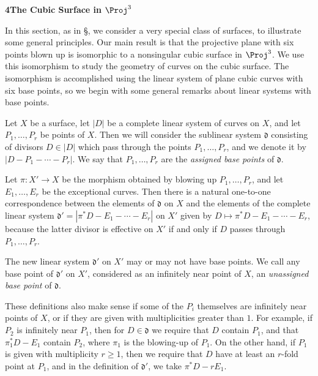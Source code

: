 {\bigskip
\noindent\hypertarget{sec-V-4}{}\textbf{\large 4\quad The Cubic Surface in $\Proj^3$}\par\medskip

\noindent In this section, as in \S{}, we consider a very special class of surfaces, to illustrate some general principles. Our main result is that the projective plane with six points blown up is isomorphic to a nonsingular cubic surface in $\Proj^3$. We use this isomorphism to study the geometry of curves on the cubic surface. The isomorphism is accomplished using the linear system of plane cubic curves with six base points, so we begin with some general remarks about linear systems with base points.

Let $X$ be a surface, let $|D|$ be a complete linear system of curves on $X$, and let $P_1,\ldots,P_r$ be points of $X$. Then we will consider the sublinear system $\mathfrak d$ consisting of divisors $D\in|D|$ which pass through the points $P_1,\ldots,P_r$, and we denote it by $|D-P_1-\cdots-P_r|$. We say that $P_1,\ldots,P_r$ are the \emph{assigned base points} of $\mathfrak d$.

Let $\pi\colon X'\to X$ be the morphism obtained by blowing up $P_1,\ldots,P_r$, and let $E_1,\ldots,E_r$ be the exceptional curves. Then there is a natural one-to-one correspondence between the elements of $\mathfrak d$ on $X$ and the elements of the complete linear system $\mathfrak d'=|\pi^*D-E_1-\cdots-E_r|$ on $X'$ given by $D\mapsto\pi^*D-E_1-\cdots-E_r$, because the latter divisor is effective on $X'$ if and only if $D$ passes through $P_1,\ldots,P_r$.

The new linear system $\mathfrak d'$ on $X'$ may or may not have base points. We call any base point of $\mathfrak d'$ on $X'$, considered as an infinitely near point of $X$, an \emph{unassigned base point} of $\mathfrak d$.

These definitions also make sense if some of the $P_i$ themselves are infinitely near points of $X$, or if they are given with multiplicities greater than $1$. For example, if $P_2$ is infinitely near $P_1$, then for $D\in\mathfrak d$ we require that $D$ contain $P_1$, and that $\pi_1^*D-E_1$ contain $P_2$, where $\pi_1$ is the blowing-up of $P_1$. On the other hand, if $P_1$ is given with multiplicity $r\ge1$, then we require that $D$ have at least an $r$-fold point at $P_1$, and in the definition of $\mathfrak d'$, we take $\pi^*D-rE_1$.
}
